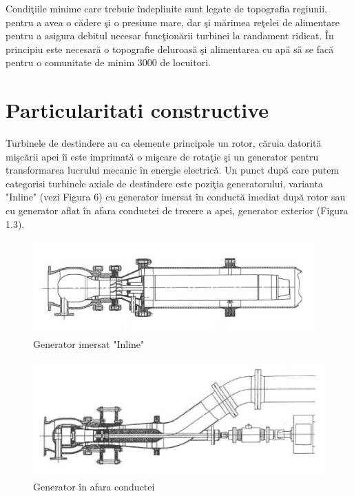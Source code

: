 Condi\c{t}iile minime care trebuie \^{i}ndeplinite sunt legate de topografia regiunii, pentru a avea o c\u{a}dere \c{s}i o presiune mare, dar \c{s}i m\u{a}rimea re\c{t}elei de alimentare pentru a asigura debitul necesar func\c{t}ion\u{a}rii turbinei la randament ridicat. \^{I}n principiu este necesar\u{a} o topografie deluroas\u{a} \c{s}i alimentarea cu ap\u{a} s\u{a} se fac\u{a} pentru o comunitate de minim 3000 de locuitori.


\section{Particularitati constructive}

Turbinele de destindere au ca elemente principale un rotor, c\u{a}ruia datorit\u{a} mi\c{s}c\u{a}rii apei \^{i}i este imprimat\u{a} o mi\c{s}care de rota\c{t}ie \c{s}i un generator pentru transformarea lucrului mecanic \^{i}n energie electric\u{a}. Un punct dup\u{a} care putem categorisi turbinele axiale de destindere este pozi\c{t}ia generatorului, varianta "Inline" (vezi Figura 6) cu generator imersat \^{i}n conduct\u{a} imediat dup\u{a} rotor sau cu generator aflat \^{i}n afara conductei de trecere a apei, generator exterior (Figura 1.3).

\begin{figure}[h!]
	\centering
	\includegraphics[scale=1.25]{figures/generator_inline.jpg}
	\caption{Generator imersat "Inline" \cite{GREES_2014}}
	\label{Generator imersat Inline}
\end{figure}

\begin{figure}[h!]
	\centering
	\includegraphics[scale=1.25]{figures/generator_in_afara_conductei.jpg}
	\caption{Generator \^{i}n afara conductei \cite{GREES_2014}}
	\label{Generator \^{i}n afara conductei}
\end{figure}

